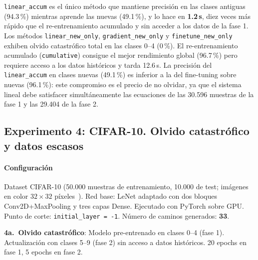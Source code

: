 \texttt{linear\_accum} es el único método que mantiene precisión en las clases antiguas (94.3\,\%)
mientras aprende las nuevas (49.1\,\%), y lo hace en \textbf{1.2\,s}, diez veces más rápido que
el re-entrenamiento acumulado y sin acceder a los datos de la fase 1. Los métodos
\texttt{linear\_new\_only}, \texttt{gradient\_new\_only} y \texttt{finetune\_new\_only} exhiben
olvido catastrófico total en las clases 0--4 (0\,\%). El re-entrenamiento acumulado
(\texttt{cumulative}) consigue el mejor rendimiento global (96.7\,\%) pero requiere acceso a los
datos históricos y tarda 12.6\,s. La precisión del \texttt{linear\_accum} en clases nuevas (49.1\,\%)
es inferior a la del fine-tuning sobre nuevas (96.1\,\%): este compromiso es el precio de no olvidar,
ya que el sistema lineal debe satisfacer simultáneamente las ecuaciones de las 30.596 muestras de la
fase 1 y las 29.404 de la fase 2.

\subsection{Experimento 4: CIFAR-10. Olvido catastrófico y datos escasos}

\paragraph{Configuración} Dataset CIFAR-10 (50.000 muestras de entrenamiento, 10.000 de test;
imágenes en color $32 \times 32$ píxeles~\cite{ref18}). Red base: LeNet adaptado con dos bloques
Conv2D+MaxPooling y tres capas Dense. Ejecutado con PyTorch sobre GPU. Punto de corte:
\texttt{initial\_layer = -1}. Número de caminos generados: \textbf{33}.

\textbf{4a.~Olvido catastrófico}: Modelo pre-entrenado en clases 0--4 (fase 1). Actualización con
clases 5--9 (fase 2) sin acceso a datos históricos. 20 epochs en fase 1, 5 epochs en fase 2.

